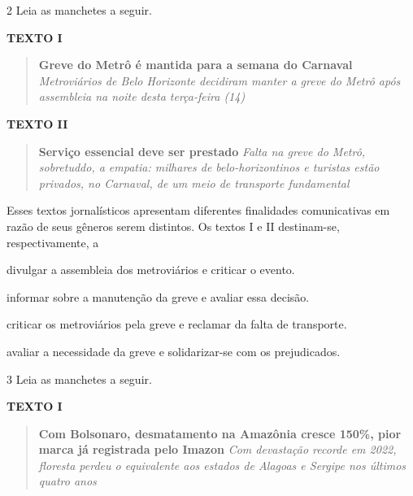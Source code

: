 \num{2} Leia as manchetes a seguir.

\textbf{TEXTO I}

\begin{quote}
\textbf{Greve do Metrô é mantida para a semana do Carnaval}
\emph{Metroviários de Belo Horizonte decidiram manter a greve do Metrô
após assembleia na noite desta terça-feira (14)}
\end{quote}


\textbf{TEXTO II}

\begin{quote}
\textbf{Serviço essencial deve ser prestado} \emph{Falta na greve do
Metrô, sobretuddo, a empatia: milhares de belo-horizontinos e turistas
estão privados, no Carnaval, de um meio de transporte fundamental}
\end{quote}


Esses textos jornalísticos apresentam diferentes finalidades
comunicativas em razão de seus gêneros serem distintos. Os textos I e II
destinam-se, respectivamente, a

\begin{escolha}
\item divulgar a assembleia dos metroviários e criticar o evento.

\item informar sobre a manutenção da greve e avaliar essa decisão.

\item criticar os metroviários pela greve e reclamar da falta de
transporte.

\item avaliar a necessidade da greve e solidarizar-se com os prejudicados.
\end{escolha}

\num{3} Leia as manchetes a seguir.

\textbf{TEXTO I}

\begin{quote}
\textbf{Com Bolsonaro, desmatamento na Amazônia cresce 150\%, pior marca
já registrada pelo Imazon} \emph{Com devastação recorde em 2022,
floresta perdeu o equivalente aos estados de Alagoas e Sergipe nos
últimos quatro anos}
\end{quote}

